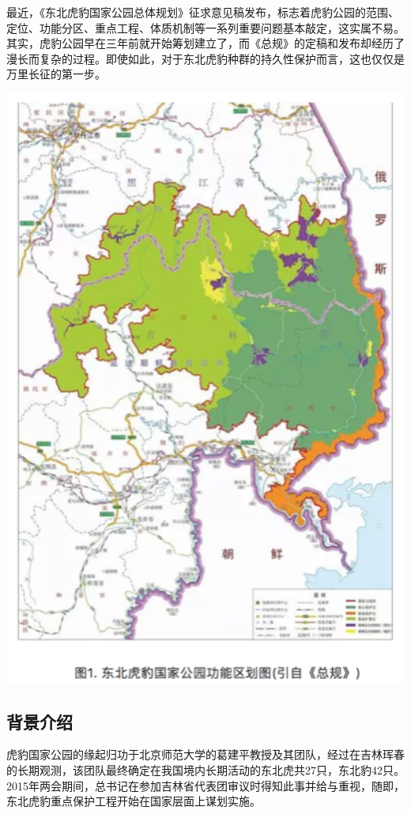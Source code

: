\documentclass[]{book}
\begin{document}
最近，《东北虎豹国家公园总体规划》征求意见稿发布，标志着虎豹公园的范围、定位、功能分区、重点工程、体质机制等一系列重要问题基本敲定，这实属不易。其实，虎豹公园早在三年前就开始筹划建立了，而《总规》的定稿和发布却经历了漫长而复杂的过程。即使如此，对于东北虎豹种群的持久性保护而言，这也仅仅是万里长征的第一步。

\includegraphics[width=5.62in]{images/tiger1}

\subsection{背景介绍}

虎豹国家公园的缘起归功于北京师范大学的葛建平教授及其团队，经过在吉林珲春的长期观测，该团队最终确定在我国境内长期活动的东北虎共27只，东北豹42只。2015年两会期间，总书记在参加吉林省代表团审议时得知此事并给与重视，随即，东北虎豹重点保护工程开始在国家层面上谋划实施。
\end{document}
